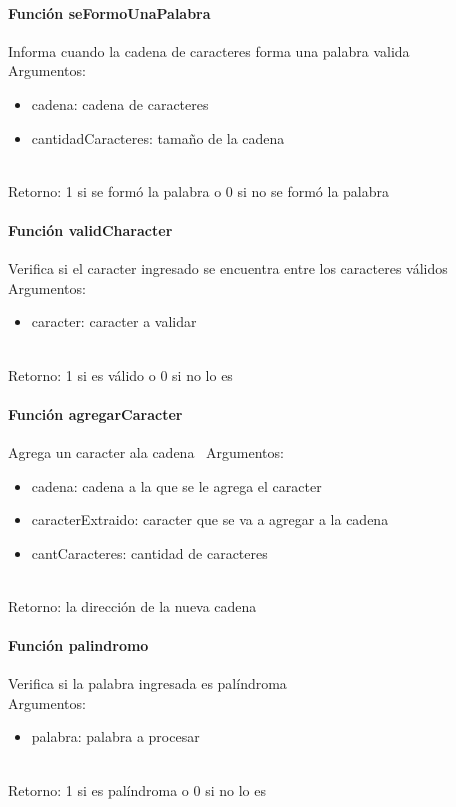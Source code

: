 \documentclass[a4paper]{article}
\begin{document}
\paragraph{Función seFormoUnaPalabra}
Informa cuando la cadena de caracteres forma una palabra valida \\
Argumentos:
	\begin{itemize}
	\item cadena: cadena de caracteres
	\item cantidadCaracteres: tamaño de la cadena
	\end{itemize} \\
Retorno: 1 si se formó la palabra o 0 si no se formó la palabra


\paragraph{Función validCharacter}
Verifica si el caracter ingresado se encuentra entre los caracteres válidos \\
Argumentos:
\begin{itemize}
	\item caracter: caracter a validar
	\end{itemize} \\
Retorno: 1 si es válido o 0 si no lo es


\paragraph{Función agregarCaracter}
Agrega un caracter ala cadena \
Argumentos:
\begin{itemize}
	\item cadena: cadena a la que se le agrega el caracter
	\item caracterExtraido: caracter que se va a agregar a la cadena
	\item cantCaracteres: cantidad de caracteres
	\end{itemize} \\
Retorno: la dirección de la nueva cadena


\paragraph{Función palindromo}
Verifica si la palabra ingresada es palíndroma \\
Argumentos:
\begin{itemize} 
	\item palabra: palabra a procesar 
\end{itemize} \\
Retorno: 1 si es palíndroma o 0 si no lo es
\end{document}
